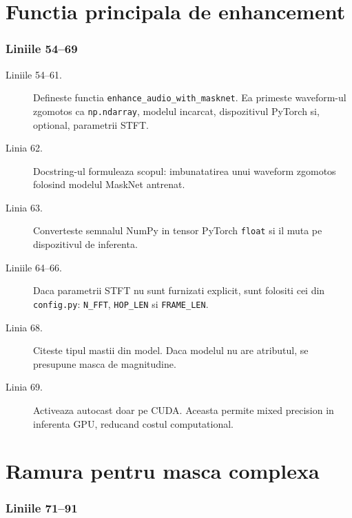 \documentclass[12pt,a4paper]{report}
\newcommand{\codechunk}[2]{%
\subsection*{Liniile #1--#2}

}
\begin{document}
\chapter{Functia principala de enhancement}

\codechunk{54}{69}

\begin{description}
    \item[Liniile 54--61.] Defineste functia \texttt{enhance\_audio\_with\_masknet}.
    Ea primeste waveform-ul zgomotos ca \texttt{np.ndarray}, modelul incarcat,
    dispozitivul PyTorch si, optional, parametrii STFT.

    \item[Linia 62.] Docstring-ul formuleaza scopul: imbunatatirea unui waveform
    zgomotos folosind modelul MaskNet antrenat.

    \item[Linia 63.] Converteste semnalul NumPy in tensor PyTorch \texttt{float}
    si il muta pe dispozitivul de inferenta.

    \item[Liniile 64--66.] Daca parametrii STFT nu sunt furnizati explicit, sunt
    folositi cei din \texttt{config.py}: \texttt{N\_FFT}, \texttt{HOP\_LEN} si
    \texttt{FRAME\_LEN}.

    \item[Linia 68.] Citeste tipul mastii din model. Daca modelul nu are atributul,
    se presupune masca de magnitudine.

    \item[Linia 69.] Activeaza autocast doar pe CUDA. Aceasta permite mixed precision
    in inferenta GPU, reducand costul computational.
\end{description}

\chapter{Ramura pentru masca complexa}

\codechunk{71}{91}
\end{document}
